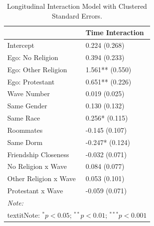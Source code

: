 \begin{table}

\caption{\label{tab:interaction-reg}Longitudinal Interaction Model with Clustered Standard Errors.}
\centering
\begin{tabular}[t]{ll}
\toprule
  & Time Interaction\\
\midrule
Intercept & 0.224 (0.268)\\
Ego: No Religion & 0.394 (0.233)\\
Ego: Other Religion & 1.561** (0.550)\\
Ego: Protestant & 0.651** (0.226)\\
Wave Number & 0.019 (0.025)\\
\addlinespace
Same Gender & 0.130 (0.132)\\
Same Race & 0.256* (0.115)\\
Roommates & -0.145 (0.107)\\
Same Dorm & -0.247* (0.124)\\
Friendship Closeness & -0.032 (0.071)\\
\addlinespace
No Religion x Wave & 0.084 (0.077)\\
Other Religion x Wave & 0.053 (0.101)\\
Protestant x Wave & -0.059 (0.071)\\
\bottomrule
\multicolumn{2}{l}{\rule{0pt}{1em}\textit{Note: }}\\
\multicolumn{2}{l}{\rule{0pt}{1em}textit{Note:} $^{*} p < 0.05$; $^{**} p < 0.01$; $^{***} p < 0.001$}\\
\end{tabular}
\end{table}
